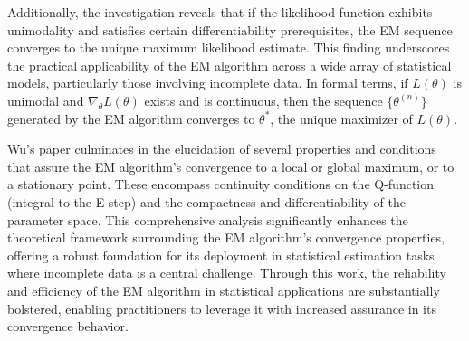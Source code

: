 \documentclass{article}
\begin{document}
Additionally, the investigation reveals that if the likelihood function exhibits unimodality and satisfies certain differentiability prerequisites, the EM sequence converges to the unique maximum likelihood estimate. This finding underscores the practical applicability of the EM algorithm across a wide array of statistical models, particularly those involving incomplete data. In formal terms, if \(L(\theta)\) is unimodal and \(\nabla_{\theta} L(\theta)\) exists and is continuous, then the sequence \(\{\theta^{(n)}\}\) generated by the EM algorithm converges to \(\theta^*\), the unique maximizer of \(L(\theta)\).

Wu’s paper culminates in the elucidation of several properties and conditions that assure the EM algorithm’s convergence to a local or global maximum, or to a stationary point. These encompass continuity conditions on the Q-function (integral to the E-step) and the compactness and differentiability of the parameter space. This comprehensive analysis significantly enhances the theoretical framework surrounding the EM algorithm's convergence properties, offering a robust foundation for its deployment in statistical estimation tasks where incomplete data is a central challenge. Through this work, the reliability and efficiency of the EM algorithm in statistical applications are substantially bolstered, enabling practitioners to leverage it with increased assurance in its convergence behavior.
\end{document}
